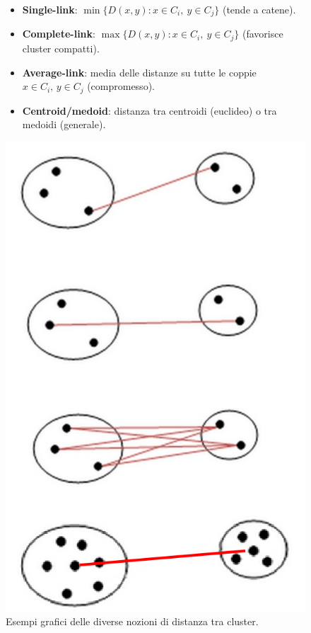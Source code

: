 \begin{figure}[htbp]
\centering
\begin{minipage}[t]{0.65\textwidth}
\vspace{0pt}
\begin{itemize}[leftmargin=1.2em]
  \item \textbf{Single-link}: $\min\{D(x,y): x\in C_i,\ y\in C_j\}$ (tende a catene).
  \item \textbf{Complete-link}: $\max\{D(x,y): x\in C_i,\ y\in C_j\}$ (favorisce cluster compatti).
  \item \textbf{Average-link}: media delle distanze su tutte le coppie $x\in C_i,\,y\in C_j$ (compromesso).
  \item \textbf{Centroid/medoid}: distanza tra centroidi (euclideo) o tra medoidi (generale).
\end{itemize}
\end{minipage}\hfill
\begin{minipage}[t]{0.27\textwidth}
\vspace{0pt}
\centering
\includegraphics[width=\linewidth]{images/cluster_distances.png}
\caption{Esempi grafici delle diverse nozioni di distanza tra cluster.}
\label{fig:cluster_distances}
\end{minipage}
\end{figure}

